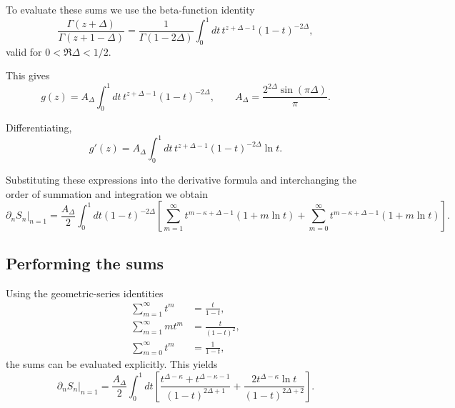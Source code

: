 \documentclass[11pt]{article}
\begin{document}
To evaluate these sums we use the beta-function identity
\begin{equation}
\frac{\Gamma(z+\Delta)}{\Gamma(z+1-\Delta)}
=
\frac{1}{\Gamma(1-2\Delta)}
\int_0^1 dt\, t^{z+\Delta-1}(1-t)^{-2\Delta},
\end{equation}
valid for $0<\Re\Delta<1/2$.

This gives
\begin{equation}
g(z)=A_\Delta\int_0^1 dt\, t^{z+\Delta-1}(1-t)^{-2\Delta},
\qquad
A_\Delta=\frac{2^{2\Delta}\sin(\pi\Delta)}{\pi}.
\end{equation}

Differentiating,
\begin{equation}
g'(z)=A_\Delta\int_0^1 dt\, t^{z+\Delta-1}(1-t)^{-2\Delta}\ln t .
\end{equation}

Substituting these expressions into the derivative formula and
interchanging the order of summation and integration we obtain
\begin{equation}
\partial_n S_n\big|_{n=1}=
\frac{A_\Delta}{2}\int_0^1 dt (1-t)^{-2\Delta}
\left[
\sum_{m=1}^\infty t^{m-\kappa+\Delta-1}(1+m\ln t)
+
\sum_{m=0}^\infty t^{m-\kappa+\Delta-1}(1+m\ln t)
\right].
\end{equation}

\subsection{Performing the sums}

Using the geometric-series identities
\begin{align}
\sum_{m=1}^\infty t^m &=\frac{t}{1-t},\\
\sum_{m=1}^\infty m t^m &=\frac{t}{(1-t)^2},\\
\sum_{m=0}^\infty t^m &=\frac{1}{1-t},
\end{align}
the sums can be evaluated explicitly.  This yields
\begin{equation}
\partial_n S_n\big|_{n=1}=
\frac{A_\Delta}{2}\int_0^1 dt
\left[
\frac{t^{\Delta-\kappa}+t^{\Delta-\kappa-1}}{(1-t)^{2\Delta+1}}
+
\frac{2t^{\Delta-\kappa}\ln t}{(1-t)^{2\Delta+2}}
\right].
\end{equation}
\end{document}
